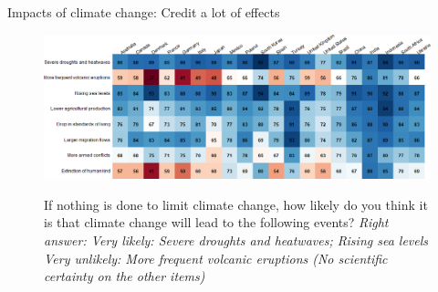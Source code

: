 \begin{frame}{Impacts of climate change: Credit a lot of effects}%
	\begin{figure}[h!]
	\centering
	\caption{If nothing is done to limit climate change, how likely do you think it is that climate change will lead to the following events?
	\newline\footnotesize{\textit{Right answer: Very likely: Severe droughts and heatwaves; Rising sea levels \\ \quad \quad \quad \quad \quad \quad Very unlikely: More frequent volcanic eruptions (No scientific certainty on the other items)}}}
	\includegraphics[width=\textwidth]{../figures/country_comparison/CC_impacts_positive_countries.png} \\
	\end{figure}
\end{frame}
	
